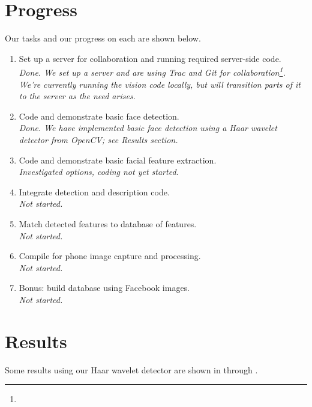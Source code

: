 \section{Progress}

Our tasks and our progress on each are shown below.

\newcommand{\prog}[1]{\textit{\\
#1}}

\begin{enumerate}
\item Set up a server for collaboration and running required
  server-side code.  \prog{Done. We set up a server and are using Trac
    and Git for
    collaboration\footnote{\code{http://cs4670.yosinski.com/}}.  We're
    currently running the vision code locally, but will transition
    parts of it to the server as the need arises.}
\item Code and demonstrate basic face detection.  \prog{Done.  We have
  implemented basic face detection using a Haar wavelet detector from
  OpenCV; see Results section.}
\item Code and demonstrate basic facial feature extraction.
  \prog{Investigated options, coding not yet started.}
\item Integrate detection and description code. \prog{Not started.}
\item Match detected features to database of features. \prog{Not started.}
\item Compile for phone image capture and processing.  \prog{Not started.}
\item Bonus: build database using Facebook images.  \prog{Not started.}
\end{enumerate}



\section{Results}

Some results using our Haar wavelet detector are shown in
 through .







